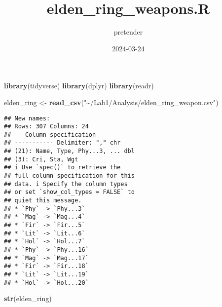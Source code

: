 \documentclass[
]{article}
\title{elden\_ring\_weapons.R}
\author{pretender}
\date{2024-03-24}
\newenvironment{Shaded}{\begin{snugshade}}{\end{snugshade}}
\newcommand{\FunctionTok}[1]{\textcolor[rgb]{0.13,0.29,0.53}{\textbf{#1}}}
\newcommand{\NormalTok}[1]{#1}
\newcommand{\OtherTok}[1]{\textcolor[rgb]{0.56,0.35,0.01}{#1}}
\newcommand{\StringTok}[1]{\textcolor[rgb]{0.31,0.60,0.02}{#1}}
\begin{document}
\maketitle

\begin{Shaded}
\begin{Highlighting}[]
\FunctionTok{library}\NormalTok{(tidyverse)}
\FunctionTok{library}\NormalTok{(dplyr)}
\FunctionTok{library}\NormalTok{(readr)}

\NormalTok{elden\_ring }\OtherTok{\textless{}{-}} \FunctionTok{read\_csv}\NormalTok{(}\StringTok{"\textasciitilde{}/Lab1/Analysis/elden\_ring\_weapon.csv"}\NormalTok{)}
\end{Highlighting}
\end{Shaded}

\begin{verbatim}
## New names:
## Rows: 307 Columns: 24
## -- Column specification
## ----------- Delimiter: "," chr
## (21): Name, Type, Phy...3, ... dbl
## (3): Cri, Sta, Wgt
## i Use `spec()` to retrieve the
## full column specification for this
## data. i Specify the column types
## or set `show_col_types = FALSE` to
## quiet this message.
## * `Phy` -> `Phy...3`
## * `Mag` -> `Mag...4`
## * `Fir` -> `Fir...5`
## * `Lit` -> `Lit...6`
## * `Hol` -> `Hol...7`
## * `Phy` -> `Phy...16`
## * `Mag` -> `Mag...17`
## * `Fir` -> `Fir...18`
## * `Lit` -> `Lit...19`
## * `Hol` -> `Hol...20`
\end{verbatim}

\begin{Shaded}
\begin{Highlighting}[]
\FunctionTok{str}\NormalTok{(elden\_ring)}
\end{Highlighting}
\end{Shaded}
\end{document}
